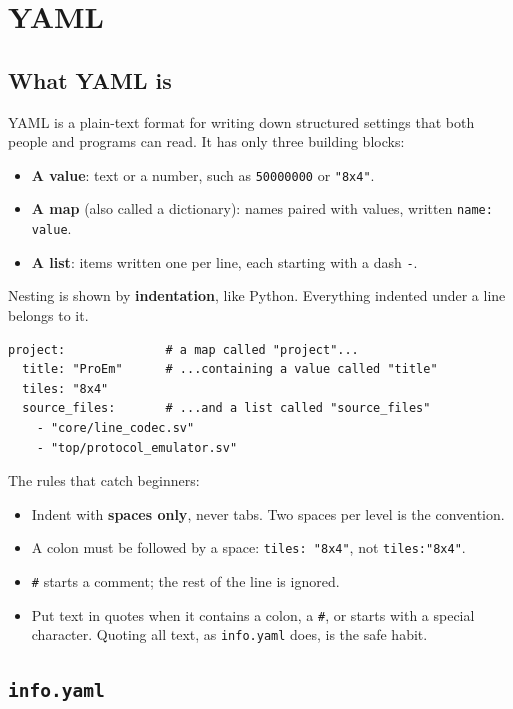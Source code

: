 \documentclass[11pt,a4paper]{article}
\newcommand{\file}[1]{\texttt{#1}}
\begin{document}
\section{YAML}\label{sec:yaml}

\subsection{What YAML is}

YAML is a plain-text format for writing down structured settings that both people and programs can read. It has only three building blocks:

\begin{itemize}
\item \textbf{A value}: text or a number, such as \texttt{50000000} or \texttt{"8x4"}.
\item \textbf{A map} (also called a dictionary): names paired with values, written \texttt{name: value}.
\item \textbf{A list}: items written one per line, each starting with a dash \texttt{-}.
\end{itemize}

Nesting is shown by \textbf{indentation}, like Python. Everything indented under a line belongs to it.

\begin{lstlisting}
project:              # a map called "project"...
  title: "ProEm"      # ...containing a value called "title"
  tiles: "8x4"
  source_files:       # ...and a list called "source_files"
    - "core/line_codec.sv"
    - "top/protocol_emulator.sv"
\end{lstlisting}

The rules that catch beginners:
\begin{itemize}
\item Indent with \textbf{spaces only}, never tabs. Two spaces per level is the convention.
\item A colon must be followed by a space: \texttt{tiles: "8x4"}, not \texttt{tiles:"8x4"}.
\item \texttt{\#} starts a comment; the rest of the line is ignored.
\item Put text in quotes when it contains a colon, a \texttt{\#}, or starts with a special character. Quoting all text, as \file{info.yaml} does, is the safe habit.
\end{itemize}

\subsection{\file{info.yaml}}
\end{document}
